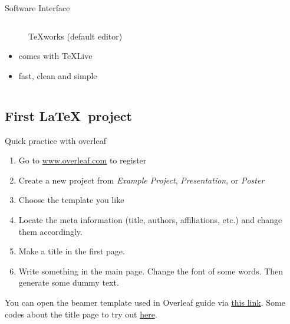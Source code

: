 \documentclass [xcolor=svgnames, t] {beamer}
\begin{document}
\begin{frame}{Software Interface}
\begin{columns}
\begin{column}{.45\textwidth}
\begin{figure}
                \caption{TeXworks (default editor)}
                \label{fig: TeXStudio}
            \end{figure}
            \vspace*{-1em}
            \begin{itemize}
                \item comes with TeXLive
                \item fast, clean and simple
            \end{itemize}
        \end{column}
    \end{columns}
\end{frame}

\subsection{First \LaTeX\ project}
\begin{frame}{Quick practice with overleaf}
    \begin{enumerate}
        \item Go to \href{https://www.overleaf.com}{www.overleaf.com} to register
        \item Create a new project from \textit{Example Project}, \textit{Presentation}, or \textit{Poster}
        \item Choose the template you like
        \item Locate the meta information (title, authors, affiliations, etc.) and change them accordingly.
        \item Make a title in the first page.
        \item Write something in the main page. Change the font of some words. Then generate some dummy text.
    \end{enumerate}
    You can open the beamer template used in Overleaf guide via \href{https://www.overleaf.com/project/new/template/19345?id=65231945}{this link}. Some codes about the title page to try out \href{https://en.wikibooks.org/wiki/LaTeX/Title_Creation}{here}.
\end{frame}
\end{document}
